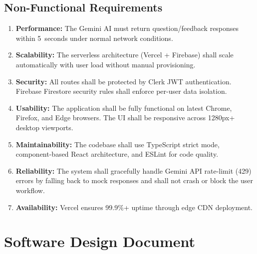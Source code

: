 \documentclass{fisatprojectfinal}
\begin{document}
\subsection{Non-Functional Requirements}
\begin{enumerate}
  \item \textbf{Performance:} The Gemini AI must return question/feedback responses within
        5~seconds under normal network conditions.
  \item \textbf{Scalability:} The serverless architecture (Vercel + Firebase) shall scale
        automatically with user load without manual provisioning.
  \item \textbf{Security:} All routes shall be protected by Clerk JWT authentication.
        Firebase Firestore security rules shall enforce per-user data isolation.
  \item \textbf{Usability:} The application shall be fully functional on latest Chrome,
        Firefox, and Edge browsers. The UI shall be responsive across 1280px+ desktop
        viewports.
  \item \textbf{Maintainability:} The codebase shall use TypeScript strict mode,
        component-based React architecture, and ESLint for code quality.
  \item \textbf{Reliability:} The system shall gracefully handle Gemini API rate-limit (429)
        errors by falling back to mock responses and shall not crash or block the user
        workflow.
  \item \textbf{Availability:} Vercel ensures 99.9\%+ uptime through edge CDN deployment.
\end{enumerate}

\section{Software Design Document}
\end{document}
